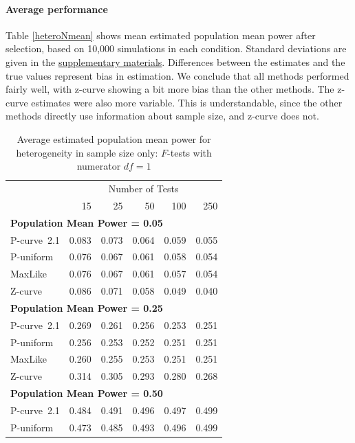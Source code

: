 \documentclass[jou]{apa6} %
\begin{document}
\paragraph{Average performance} Table \ref{heteroNmean} shows mean estimated population mean power after selection, based on 10,000 simulations in each condition. Standard deviations are given in the \href{http://www.utstat.toronto.edu/~brunner/zcurve2018} {supplementary materials}. Differences between the estimates and the true values represent bias in estimation. We conclude that all methods performed fairly well, with z-curve showing a bit more bias than the other methods. The z-curve estimates were also more variable. This is understandable, since the other methods directly use information about sample size, and z-curve does not.

\begin{table}
\caption{Average estimated population mean power for heterogeneity in sample size only: $F$-tests with numerator $df=1$}
{\small
\begin{center}
\begin{tabular}{lrrrrr}  \hline
      & \multicolumn{5}{c}{Number of Tests}\\ 
      &  15 & 25 & 50 & 100 & 250 \\ \hline
\multicolumn{6}{l}{\textbf{Population Mean Power = 0.05}} \\ \hline
P-curve~2.1   & 0.083 & 0.073 & 0.064 & 0.059 & 0.055  \\
P-uniform & 0.076 & 0.067 & 0.061 & 0.058 & 0.054  \\
MaxLike   & 0.076 & 0.067 & 0.061 & 0.057 & 0.054  \\
Z-curve   & 0.086 & 0.071 & 0.058 & 0.049 & 0.040  \\ \hline
\multicolumn{6}{l}{\textbf{Population Mean Power = 0.25}} \\ \hline
P-curve~2.1   & 0.269 & 0.261 & 0.256 & 0.253 & 0.251 \\
P-uniform & 0.256 & 0.253 & 0.252 & 0.251 & 0.251 \\
MaxLike   & 0.260 & 0.255 & 0.253 & 0.251 & 0.251 \\
Z-curve   & 0.314 & 0.305 & 0.293 & 0.280 & 0.268 \\ \hline
\multicolumn{6}{l}{\textbf{Population Mean Power = 0.50}} \\ \hline
P-curve~2.1   & 0.484 & 0.491 & 0.496 & 0.497 & 0.499 \\
P-uniform & 0.473 & 0.485 & 0.493 & 0.496 & 0.499  \\

\end{tabular}
\end{center}}
\end{table}
\end{document}
